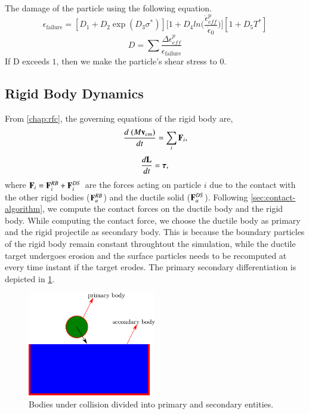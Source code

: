 The damage of the particle using the following equation.
\begin{equation}
  \epsilon_{\text{failure}} = [D_1 + D_2 \exp(D_3 \sigma^{*})]
  \bigg[ 1 + D_4 ln\big(\frac{\dot{\epsilon}_{eff}^p}{\dot{\epsilon}_{0}})\bigg]
  [1 + D_5 T^*]
\end{equation}
\begin{equation}
  D = \sum\frac{\Delta \epsilon_{eff}^p}{\epsilon_{\text{failure}}}
\end{equation}
If D exceeds $1$, then we make the particle's shear stress to $0$.



\subsection{Rigid Body Dynamics}
\label{chap-erosion:sec:rigid-body-dynamics}
From \cref{chap:rfc}, the governing equations of the rigid body are,
\begin{equation}
  \label{eq:balance_linear_mom}
  \frac{d \; (M \mathbf{v}_{cm})}{d t} = \sum_i \mathbf{F}_i,
\end{equation}
\begin{equation}
  \label{eq:balance_angular_mom}
  \frac{d \mathbf{L}}{d t} = \boldsymbol{\tau},
\end{equation}
where $\mathbf{F}_i = \mathbf{F}^{RB}_i + \mathbf{F}^{DS}_i$ are the forces acting on
particle $i$ due to the contact with the other rigid bodies ($\mathbf{F}^{RB}_a$)
and the ductile solid ($\mathbf{F}^{DS}_a$). Following
\cref{sec:contact-algorithm}, we compute the contact
forces on the ductile body and the rigid body. While computing the contact
force, we choose the ductile body as primary and the rigid projectile as
secondary body. This is because the boundary particles of the rigid body remain
constant throughtout the simulation, while the ductile target undergoes erosion and
the surface particles needs to be recomputed at every time instant if the target
erodes. The primary secondary differentiation is depicted in
\cref{fig:erosion-cnt-force-divide-bodies}.
\begin{figure}[!htpb]
  \centering
  \includegraphics[width=0.5\textwidth]{images/erosion/images/contact_force/contact_force_divide}
  \caption{Bodies under collision divided into primary and secondary entities.}
\label{fig:erosion-cnt-force-divide-bodies}
\end{figure}


